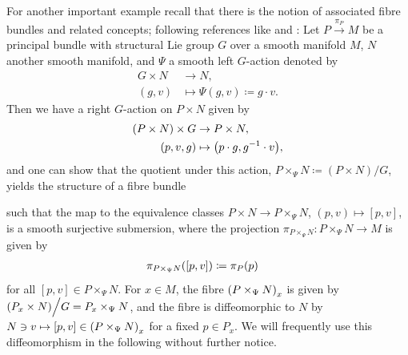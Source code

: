 \documentclass[reqno,a4paper,oneside]{amsart}
\theoremstyle{plain}
\theoremstyle{remark}
\theoremstyle{definition}
\begin{document}
For another important example recall that there is the notion of associated fibre bundles and related concepts; following references like \cite[\S1, Construction 1.3.8, page 20]{mackenzieGeneralTheory} and \cite[\S 4.7, page 237ff.; see also Rem.\ 4.7.8, page 242f.]{Hamilton}: Let $P \stackrel{\pi_P}{\to} M$ be a principal bundle with structural Lie group $G$ over a smooth manifold $M$, $N$ another smooth manifold, and $\Psi$ a smooth left $G$-action denoted by
\begin{align*}
G \times N &\to N,\\
(g, v) &\mapsto \Psi(g, v) \coloneqq g \cdot v.
\end{align*}
Then we have a right $G$-action on $P \times N$ given by
\begin{align*}
(P \times N) \times G &\to P \times N,\\
(p,v,g) &\mapsto \mleft( p \cdot g, g^{-1} \cdot v \mright),
\end{align*}
and one can show that the quotient under this action, $P\times_\Psi N \coloneqq ( P \times N) \Big/ G$, yields the structure of a fibre bundle
\begin{center}
\end{center}
such that the map to the equivalence classes $P \times N \to P \times_\Psi N$, $(p, v) \mapsto [p, v]$, is a smooth surjective submersion,
where the projection $\pi_{P\times_\Psi N}: P\times_\Psi N \to M$ is given by 
\begin{align*}
\pi_{P\times_\Psi N}\mleft( [p, v] \mright)
&\coloneqq
\pi_P(p)
\end{align*}
for all $[p, v] \in P\times_\Psi N$. For $x \in M$, the fibre $\mleft(P\times_\Psi N\mright)_x$ is given by $\mleft( P_x \times N  \mright) \Big/ G = P_x \times_\Psi N$, and the fibre is diffeomorphic to $N$ by $N \ni v \mapsto [p, v] \in \mleft(P\times_\Psi N\mright)_x$ for a fixed $p \in P_x$. We will frequently use this diffeomorphism in the following without further notice.
\end{document}
